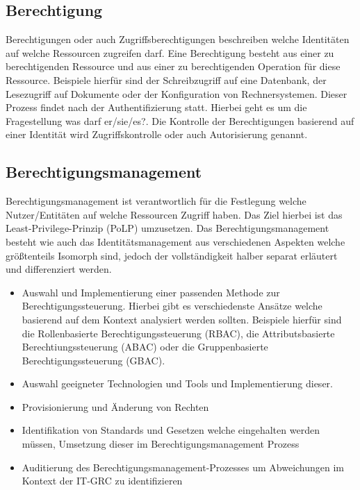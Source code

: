 \documentclass[10pt]{article}
\begin{document}
\subsection{Berechtigung}
Berechtigungen oder auch Zugriffsberechtigungen beschreiben welche Identitäten auf welche Ressourcen zugreifen darf. Eine Berechtigung besteht aus einer zu berechtigenden Ressource und aus einer zu berechtigenden Operation für diese Ressource. Beispiele hierfür sind der Schreibzugriff auf eine Datenbank, der Lesezugriff auf Dokumente oder der Konfiguration von Rechnersystemen. Dieser Prozess findet nach der Authentifizierung statt. Hierbei geht es um die Fragestellung \glqq{}was darf er/sie/es?\grqq{}. Die Kontrolle der Berechtigungen basierend auf einer Identität wird Zugriffskontrolle oder auch Autorisierung genannt.~\cite{tsolkas2017}
\subsection{Berechtigungsmanagement}
Berechtigungsmanagement ist verantwortlich für die Festlegung welche Nutzer/Entitäten auf welche Ressourcen Zugriff haben. Das Ziel hierbei ist das Least-Privilege-Prinzip (PoLP) umzusetzen. Das Berechtigungsmanagement besteht wie auch das Identitätsmanagement aus verschiedenen Aspekten welche größtenteils Isomorph sind, jedoch der vollständigkeit halber separat erläutert und differenziert werden.
\begin{itemize}
  \item Auswahl und Implementierung einer passenden Methode zur Berechtigungssteuerung. Hierbei gibt es verschiedenste Ansätze welche basierend auf dem Kontext analysiert werden sollten. Beispiele hierfür sind die Rollenbasierte Berechtigungssteuerung (RBAC), die Attributsbasierte Berechtiungssteuerung (ABAC) oder die Gruppenbasierte Berechtigungssteuerung (GBAC).
  \item Auswahl geeigneter Technologien und Tools und Implementierung dieser.
  \item Provisionierung und Änderung von Rechten
  \item Identifikation von Standards und Gesetzen welche eingehalten werden müssen, Umsetzung dieser im Berechtigungsmanagement Prozess
  \item Auditierung des Berechtigungsmanagement-Prozesses um Abweichungen im Kontext der IT-GRC zu identifizieren
\end{itemize}
\end{document}
